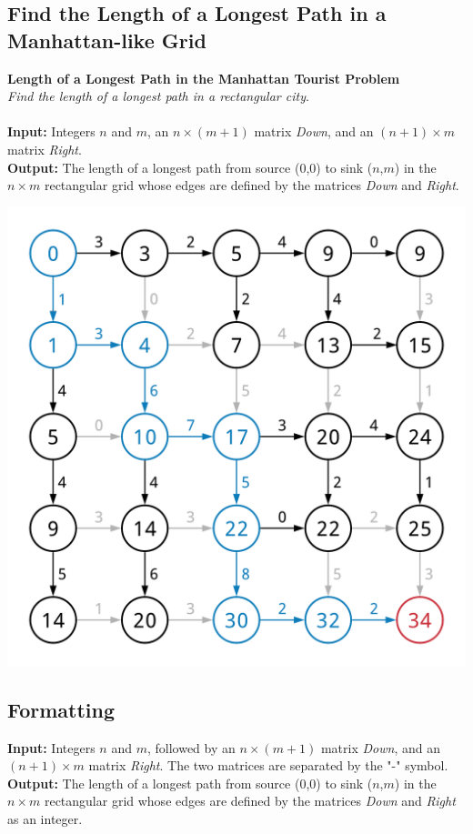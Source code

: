 \documentclass{article}
\begin{document}
\subsection{Find the Length of a Longest Path in a Manhattan-like Grid}
\hline\vspace{5}
\textbf{Length of a Longest Path in the Manhattan Tourist Problem}\\
\emph{Find the length of a longest path in a rectangular city}.\\ \\
\textbf{Input:} Integers $n$ and $m$, an $n\times(m+1)$ matrix \emph{Down}, and an $(n+1)\times m$ matrix \emph{Right}.\\
\textbf{Output:} The length of a longest path from source ($0$,$0$) to sink ($n$,$m$) in the $n\times m$ rectangular grid whose edges are defined by the matrices \emph{Down} and \emph{Right}.
\begin{center}
    \includegraphics[scale=0.12]{c5/logos/5B.png}
\end{center}
\hline\vspace{5}

\subsection*{Formatting}
\noindent\textbf{Input:} Integers $n$ and $m$, followed by an $n\times(m+1)$ matrix \emph{Down}, and an $(n+1)\times m$ matrix \emph{Right}. The two matrices are separated by the "-" symbol.\\
\noindent\textbf{Output:} The length of a longest path from source ($0$,$0$) to sink ($n$,$m$) in the $n\times m$ rectangular grid whose edges are defined by the matrices \emph{Down} and \emph{Right} as an integer.
\end{document}
